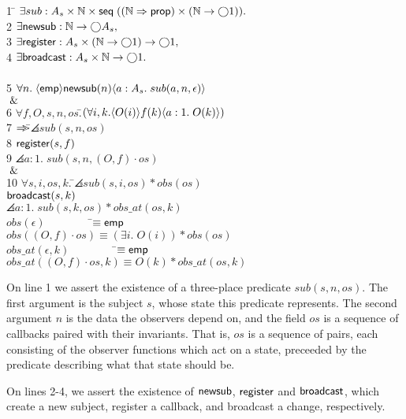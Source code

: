 \begin{tabbing}
1 \qquad \= $\exists sub : A_s \times \mathbb{N} \times \mathsf{seq}\;{((\mathbb{N} \Rightarrow \mathsf{prop}) \times (\mathbb{N} \to \bigcirc{1}))}.$ \\
2 \> $\exists \mathsf{newsub} : \mathbb{N} \to \bigcirc{A_s},$ \\ 
3 \> $\exists \mathsf{register} : A_s \times (\mathbb{N} \to \bigcirc{1}) \to \bigcirc{1},$ \\
4 \> $\exists \mathsf{broadcast} : A_s \times \mathbb{N} \to \bigcirc{1}.$ \\
\\[0.5em]
5 \>$\forall n.\; \langle{\mathsf{emp}}\rangle{{\mathsf{newsub}(n)}}\langle{a:A_s}.\;{sub(a, n, \epsilon)}\rangle$ \\
\> $\;\&\;$ \\
6 \> $\forall f, O, s, n, os. $\=$(\forall i, k. \langle{O(i)}\rangle{{f(k)}}\langle{a:1}.\;{O(k)}\rangle)$ \\
7\> \>$\Rightarrow\!\!\!>$\=$\angles{sub(s, n, os)}$ \\
8\> \>          \>${\mathsf{register}(s, f)}$ \\
9 \> \>          \>$\angles{a:1.\; sub(s, n, (O,f)\cdot os)}$ \\
\> $\;\&\;$ \\
10 \> $\forall s,i,os,k.\; $\=$\angles{sub(s, i, os) * obs(os)}$ \\
  \>                       \>${\mathsf{broadcast}}(s,k)$ \\
  \>                       \>$\angles{a:1.\; sub(s, k, os) * obs\_at(os, k)}$ 
\\[0.5em]
$obs(\epsilon) \;\qquad\qquad $\=$\equiv \mathsf{emp}$ \\
$obs((O,f)\cdot os) $\>$\equiv (\exists i.\; O(i)) * obs(os)$ 
\\[0.5em]
$obs\_at(\epsilon, k) \;\qquad\qquad $\=$\equiv \mathsf{emp}$ \\
$obs\_at((O,f)\cdot os, k) $\>$\equiv O(k) * obs\_at(os, k)$ 
\\
\end{tabbing}

%
On line 1 we assert the existence of a three-place predicate $sub(s,
n, os)$. The first argument is the subject $s$, whose state this
predicate represents. The second argument $n$ is the data the
observers depend on, and the field $os$ is a sequence of callbacks
paired with their invariants. That is, $os$ is a sequence of pairs,
each consisting of the observer functions which act on a state,
preceeded by the predicate describing what that state should be.

On lines 2-4, we assert the existence of $\mathsf{newsub}$,
$\mathsf{register}$ and $\mathsf{broadcast}$, which create a new
subject, register a callback, and broadcast a change, respectively.

